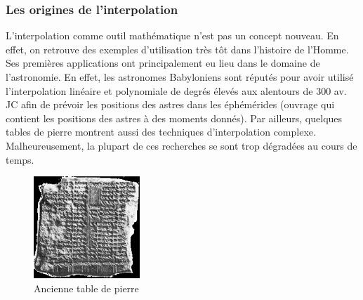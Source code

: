 \documentclass{article}
\begin{document}
\subsubsection{Les origines de l'interpolation}

	L'interpolation comme outil math\'{e}matique n'est pas un concept nouveau. En effet, on retrouve des exemples d'utilisation tr\`{e}s t\^{o}t dans l'histoire de l'Homme. Ses premi\`{e}res applications ont principalement eu lieu dans le domaine de l'astronomie. En effet, les astronomes Babyloniens sont r\'{e}put\'{e}s pour avoir utilis\'{e} l'interpolation lin\'{e}aire et polynomiale de degr\'{e}s \'{e}lev\'{e}s aux alentours de 300 av. JC afin de pr\'{e}voir les positions des astres dans les \'{e}ph\'{e}m\'{e}rides (ouvrage qui contient les positions des astres \`{a} des moments donn\'{e}s). Par ailleurs, quelques tables de pierre montrent aussi des techniques d'interpolation complexe. Malheureusement, la plupart de ces recherches se sont trop d\'{e}grad\'{e}es au cours de temps.

\begin{figure}[h]
	\centering
	\includegraphics[width=4cm]{cuneiform.jpg}
	\caption{Ancienne table de pierre}
\end{figure}
\end{document}
